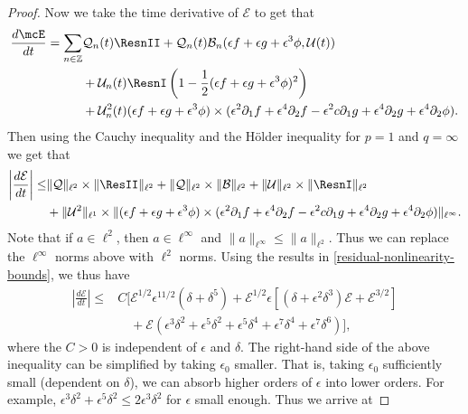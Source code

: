 \documentclass[oneside,reqno]{amsart}
\newcommand{\Z}{\mathbb{Z}}
\begin{document}
\begin{proof}
	Now we take the time derivative of \(\mathcal E\) to get that 
	\begin{equation*}
		\begin{aligned}
			\frac{d\mcE}{dt} = \sum_{n \in \Z} &\mathcal Q_n(t) \ResnII + \mathcal Q_n(t) 	\mathcal B_n(\epsilon f + \epsilon g + \epsilon^3 \phi, \mathcal U(t)) \\
			&+ \mathcal U_n(t) \ResnI \left( 1 - \frac 12 (\epsilon f+ \epsilon g + \epsilon^3 \phi)^2  \right) \\
			&+ \mathcal U_n^2(t)(\epsilon f + \epsilon g + \epsilon^3 \phi) \times (\epsilon^2\partial_1 f + \epsilon^4\partial_2 f -\epsilon^2 c \partial_1 g + \epsilon^4 \partial_2 g + \epsilon^4 \partial_2 \phi).
		\end{aligned}
	\end{equation*}
	Then using the Cauchy inequality and the H\"older inequality for \(p=1\) and \(q=\infty\) we get that
	\begin{equation*}
		\begin{aligned}
			\left| \frac{d\mathcal E}{dt} \right| \leq& \| \mathcal Q \|_{\ell^2 }\times \|\ResII \|_{\ell^2} + \| \mathcal Q \|_{\ell^2} \times \| \mathcal B \|_{\ell^2}  + \|\mathcal U \|_{\ell^2} \times \| \ResnI \|_{\ell^2}\\
			& + \|\mathcal U^2 \|_{\ell^1} \times  \| (\epsilon f+ \epsilon g + \epsilon^3 \phi)  \times  (\epsilon^2\partial_1 f + \epsilon^4\partial_2 f -\epsilon^2 c \partial_1 g + \epsilon^4 \partial_2 g + \epsilon^4 \partial_2 \phi )\|_{\ell^\infty} .
		\end{aligned}
	\end{equation*}
	Note that if \(a \in \ell^2\), then \(a\in \ell^\infty\) and \(\|a\|_{\ell^\infty} \leq \|a \|_{\ell^2}\). Thus we can replace the \(\ell^\infty\) norms above with \(\ell^2\) norms. Using the results in \cref{residual-nonlinearity-bounds}, we thus have 
	\begin{equation*}
		\begin{aligned}
			\left| \frac{d\mathcal E}{dt} \right| \leq& C\Big[\mathcal E^{1/2} \epsilon^{11/2}(\delta + \delta^5) + \mathcal E^{1/2}\epsilon [(\delta + \epsilon^2 \delta^3)\mathcal E + \mathcal E^{3/2}]  \\
			&\quad + \mathcal E(\epsilon^3 \delta^2 + \epsilon^5\delta^2 + \epsilon^5 \delta^4 + \epsilon^7\delta^4 + \epsilon^7 \delta^6) \Big],
		\end{aligned}
	\end{equation*}
	where the \(C>0\) is independent of \(\epsilon\) and \(\delta\). The right-hand side of the above inequality can be simplified by taking \(\epsilon_0\) smaller. That is, taking \(\epsilon_0\) sufficiently small (dependent on \(\delta\)), we can absorb higher orders of \(\epsilon\) into lower orders. For example, \(\epsilon^3 \delta^2 + \epsilon^5\delta^2 \leq 2 \epsilon^3 \delta^2\) for \(\epsilon\) small enough. Thus we arrive at  		

\end{proof}
\end{document}

